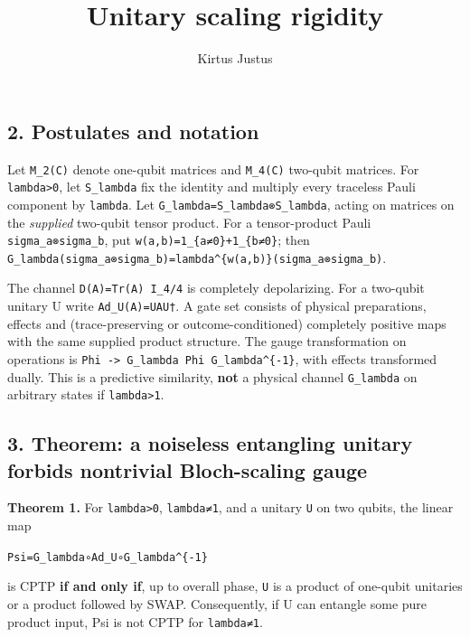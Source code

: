 \documentclass[
  10pt,
  a4paper,
]{article}
\title{Unitary scaling rigidity}
\author{Kirtus Justus}
\date{}
\begin{document}
\maketitle

\subsection{2. Postulates and notation}\label{postulates-and-notation}

Let \texttt{M\_2(C)} denote one-qubit matrices and \texttt{M\_4(C)} two-qubit matrices. For \texttt{lambda\textgreater{}0}, let \texttt{S\_lambda} fix the identity and multiply every traceless Pauli component by \texttt{lambda}. Let \texttt{G\_lambda=S\_lambda⊗S\_lambda}, acting on matrices on the \emph{supplied} two-qubit tensor product. For a tensor-product Pauli \texttt{sigma\_a⊗sigma\_b}, put \texttt{w(a,b)=1\_\{a≠0\}+1\_\{b≠0\}}; then \texttt{G\_lambda(sigma\_a⊗sigma\_b)=lambda\^{}\{w(a,b)\}(sigma\_a⊗sigma\_b)}.

The channel \texttt{D(A)=Tr(A)\ I\_4/4} is completely depolarizing. For a two-qubit unitary U write \texttt{Ad\_U(A)=UAU†}. A gate set consists of physical preparations, effects and (trace-preserving or outcome-conditioned) completely positive maps with the same supplied product structure. The gauge transformation on operations is \texttt{Phi\ -\textgreater{}\ G\_lambda\ Phi\ G\_lambda\^{}\{-1\}}, with effects transformed dually. This is a predictive similarity, \textbf{not} a physical channel \texttt{G\_lambda} on arbitrary states if \texttt{lambda\textgreater{}1}.

\subsection{3. Theorem: a noiseless entangling unitary forbids nontrivial Bloch-scaling gauge}\label{theorem-a-noiseless-entangling-unitary-forbids-nontrivial-bloch-scaling-gauge}

\textbf{Theorem 1.} For \texttt{lambda\textgreater{}0}, \texttt{lambda≠1}, and a unitary \texttt{U} on two qubits, the linear map

\texttt{Psi=G\_lambda∘Ad\_U∘G\_lambda\^{}\{-1\}}

is CPTP \textbf{if and only if}, up to overall phase, \texttt{U} is a product of one-qubit unitaries or a product followed by SWAP. Consequently, if U can entangle some pure product input, Psi is not CPTP for \texttt{lambda≠1}.
\end{document}
